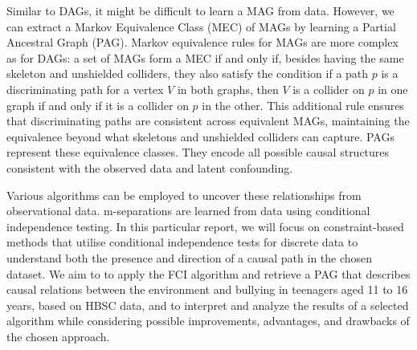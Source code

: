\documentclass[main.tex]{subfiles}
\begin{document}
Similar to DAGs, it might be difficult to learn a MAG from data. However, we can extract a Markov Equivalence Class (MEC) of MAGs by learning a Partial Ancestral Graph (PAG). Markov equivalence rules for MAGs are more complex as for DAGs: a set of MAGs form a MEC if and only if, besides having the same skeleton and unshielded colliders, they also satisfy the condition if a path \( p \) is a discriminating path for a vertex \( V \) in both graphs, then \( V \) is a collider on \( p \) in one graph if and only if it is a collider on \( p \) in the other.
This additional rule ensures that discriminating paths are consistent across equivalent MAGs, maintaining the equivalence beyond what skeletons and unshielded colliders can capture. PAGs represent these equivalence classes. They encode all possible causal structures consistent with the observed data and latent confounding.

 Various algorithms can be employed to uncover these relationships from observational data. m-separations are learned from data using conditional independence testing. In this particular report, we will focus on constraint-based methods that utilise conditional independence tests for discrete data to understand both the presence and direction of a causal path in the chosen dataset. We aim to to apply the FCI algorithm and retrieve a PAG that describes causal relations between the environment and bullying in teenagers aged 11 to 16 years, based on HBSC data, and to interpret and analyze the results of a selected algorithm while considering possible improvements, advantages, and drawbacks of the chosen approach.





\end{document}
